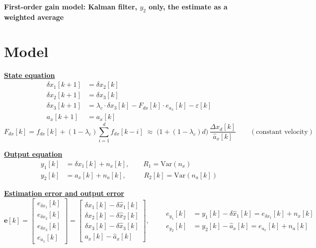 \documentclass[11pt,a4paper]{ctexart}
\newcommand{\lc}{\lambda_c}
\newcommand{\hd}[1]{\par\bigskip\noindent\underline{\textbf{#1}}}
\begin{document}
\begin{center}\textbf{\large First-order gain model: Kalman filter, $y_2$ only, the estimate as a weighted average}\end{center}

\section{Model}

\hd{State equation}
\[
\begin{aligned}
\delta x_1[k+1] &= \delta x_2[k] \\
\delta x_2[k+1] &= \delta x_3[k] \\
\delta x_3[k+1] &= \lc \cdot \delta x_3[k] - F_{dx}[k]\cdot e_{a_x}[k] - \varepsilon[k] \\
a_x[k+1] &= a_x[k]
\end{aligned}
\]
\[
F_{dx}[k] = f_{dx}[k] + (1-\lc)\textstyle\sum_{i=1}^{d} f_{dx}[k-i] \;\approx\; \big(1 + (1-\lc)d\big)\,\dfrac{\Delta x_d[k]}{\hat a_x[k]} \qquad (\text{constant velocity})
\]

\hd{Output equation}
\[
\begin{aligned}
y_1[k] &= \delta x_1[k] + n_x[k], \qquad R_1 = \mathrm{Var}(n_x) \\
y_2[k] &= a_x[k] + n_a[k], \qquad\;\; R_2[k] = \mathrm{Var}(n_a[k])
\end{aligned}
\]

\hd{Estimation error and output error}
\[
\mathbf{e}[k] = \begin{bmatrix} e_{\delta x_1}[k] \\ e_{\delta x_2}[k] \\ e_{\delta x_3}[k] \\ e_{a_x}[k] \end{bmatrix}
= \begin{bmatrix} \delta x_1[k] - \delta\hat x_1[k] \\ \delta x_2[k] - \delta\hat x_2[k] \\ \delta x_3[k] - \delta\hat x_3[k] \\ a_x[k] - \hat a_x[k] \end{bmatrix},
\qquad
\begin{aligned}
e_{y_1}[k] &= y_1[k] - \delta\hat x_1[k] = e_{\delta x_1}[k] + n_x[k] \\
e_{y_2}[k] &= y_2[k] - \hat a_x[k] = e_{a_x}[k] + n_a[k]
\end{aligned}
\]
\end{document}
